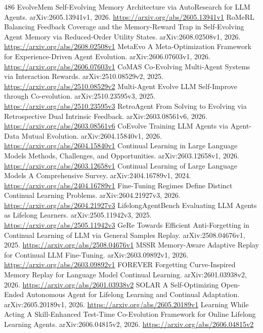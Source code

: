 \documentclass[11pt]{article}
\begin{document}
\begin{thebibliography}{486}
 EvolveMem Self-Evolving Memory Architecture via AutoResearch for LLM Agents. arXiv:2605.13941v1, 2026. \url{https://arxiv.org/abs/2605.13941v1}
 RoMeRL Balancing Feedback Coverage and the Memory-Reward Trap in Self-Evolving Agent Memory via Reduced-Order Utility States. arXiv:2608.02508v1, 2026. \url{https://arxiv.org/abs/2608.02508v1}
 MetaEvo A Meta-Optimization Framework for Experience-Driven Agent Evolution. arXiv:2606.07603v1, 2026. \url{https://arxiv.org/abs/2606.07603v1}
 CoMAS Co-Evolving Multi-Agent Systems via Interaction Rewards. arXiv:2510.08529v2, 2025. \url{https://arxiv.org/abs/2510.08529v2}
 Multi-Agent Evolve LLM Self-Improve through Co-evolution. arXiv:2510.23595v3, 2025. \url{https://arxiv.org/abs/2510.23595v3}
 RetroAgent From Solving to Evolving via Retrospective Dual Intrinsic Feedback. arXiv:2603.08561v6, 2026. \url{https://arxiv.org/abs/2603.08561v6}
 CoEvolve Training LLM Agents via Agent-Data Mutual Evolution. arXiv:2604.15840v1, 2026. \url{https://arxiv.org/abs/2604.15840v1}
 Continual Learning in Large Language Models Methods, Challenges, and Opportunities. arXiv:2603.12658v1, 2026. \url{https://arxiv.org/abs/2603.12658v1}
 Continual Learning of Large Language Models A Comprehensive Survey. arXiv:2404.16789v1, 2024. \url{https://arxiv.org/abs/2404.16789v1}
 Fine-Tuning Regimes Define Distinct Continual Learning Problems. arXiv:2604.21927v3, 2026. \url{https://arxiv.org/abs/2604.21927v3}
 LifelongAgentBench Evaluating LLM Agents as Lifelong Learners. arXiv:2505.11942v3, 2025. \url{https://arxiv.org/abs/2505.11942v3}
 GeRe Towards Efficient Anti-Forgetting in Continual Learning of LLM via General Samples Replay. arXiv:2508.04676v1, 2025. \url{https://arxiv.org/abs/2508.04676v1}
 MSSR Memory-Aware Adaptive Replay for Continual LLM Fine-Tuning. arXiv:2603.09892v1, 2026. \url{https://arxiv.org/abs/2603.09892v1}
 FOREVER Forgetting Curve-Inspired Memory Replay for Language Model Continual Learning. arXiv:2601.03938v2, 2026. \url{https://arxiv.org/abs/2601.03938v2}
 SOLAR A Self-Optimizing Open-Ended Autonomous Agent for Lifelong Learning and Continual Adaptation. arXiv:2605.20189v1, 2026. \url{https://arxiv.org/abs/2605.20189v1}
 Learning While Acting A Skill-Enhanced Test-Time Co-Evolution Framework for Online Lifelong Learning Agents. arXiv:2606.04815v2, 2026. \url{https://arxiv.org/abs/2606.04815v2}

\end{thebibliography}
\end{document}
